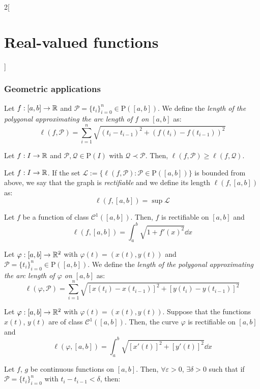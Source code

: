 \documentclass[../../../main.tex]{subfiles}
\begin{document}
\begin{multicols}{2}[\section{Real-valued functions}]
  \subsubsection{Geometric applications}
  \begin{definition}
    Let $f:[a,b]\rightarrow\mathbb{R}$ and $\mathcal{P}=\{t_i\}_{i=0}^n\in\mathrm{P}([a,b])$. We define the \textit{length of the polygonal approximating the arc length of $f$ on $[a,b]$} as: $$\ell(f,\mathcal{P})=\sum_{i=1}^n\sqrt{{(t_i-t_{i-1})}^2+{(f(t_i)-f(t_{i-1}))}^2}$$
  \end{definition}
  \begin{lemma}
    Let $f:I\rightarrow\mathbb{R}$ and $\mathcal{P},\mathcal{Q}\in\mathrm{P}(I)$ with $\mathcal{Q}\prec\mathcal{P}$. Then, $\ell(f,\mathcal{P})\geq \ell(f,\mathcal{Q})$.
  \end{lemma}
  \begin{definition}
    Let $f:I\rightarrow\mathbb{R}$. If the set $\mathcal{L}:=\{\ell(f,\mathcal{P}):\mathcal{P}\in\mathrm{P}([a,b])\}$ is bounded from above, we say that the graph is \textit{rectifiable} and we define its length $\ell(f,[a,b])$ as: $$\ell(f,[a,b])=\sup \mathcal{L}$$
  \end{definition}
  \begin{prop}
    Let $f$ be a function of class $\mathcal{C}^1([a,b])$. Then, $f$ is rectifiable on $[a,b]$ and $$\ell(f,[a,b])=\int_a^b\sqrt{1+{f'(x)}^2}\dd x$$
  \end{prop}
  \begin{definition}
    Let $\varphi:[a,b]\rightarrow\mathbb{R}^2$ with $\varphi(t)=(x(t),y(t))$ and $\mathcal{P}=\{t_i\}_{i=0}^n\in\mathrm{P}([a,b])$. We define the \textit{length of the polygonal approximating the arc length of $\varphi$ on $[a,b]$} as: $$\ell(\varphi,\mathcal{P})=\sum_{i=1}^n\sqrt{{[x(t_i)-x(t_{i-1})]}^2+{[y(t_i)-y(t_{i-1})]}^2}$$
  \end{definition}
  \begin{prop}
    Let $\varphi:[a,b]\rightarrow\mathbb{R}^2$ with $\varphi(t)=(x(t),y(t))$. Suppose that the functions $x(t)$, $y(t)$ are of class $\mathcal{C}^1([a,b])$. Then, the curve $\varphi$ is rectifiable on $[a,b]$ and $$\ell(\varphi,[a,b])=\int_a^b\sqrt{{[x'(t)]}^2+{[y'(t)]}^2}\dd x$$
  \end{prop}
  \begin{lemma}
    Let $f$, $g$ be continuous functions on $[a,b]$. Then, $\forall\varepsilon>0$, $\exists\delta>0$ such that if $\mathcal{P}=\{t_i\}_{i=0}^n$ with $t_i-t_{i-1}<\delta$, then:
    \begin{multline*}

\end{multline*}
\end{lemma}
\end{multicols}
\end{document}
